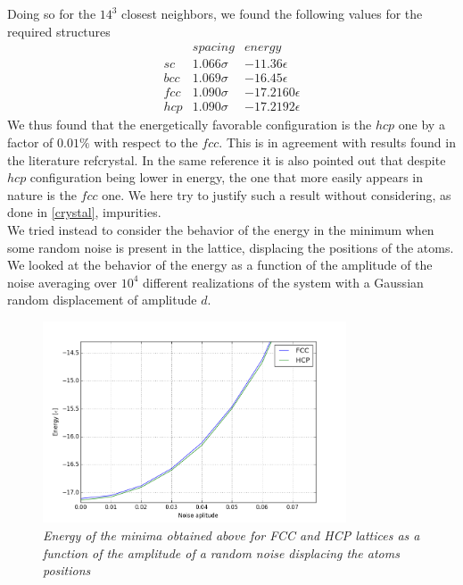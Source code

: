 \documentclass[a4paper]{article}
\begin{document}
Doing so for the $14^3$ closest neighbors, we found the following values for the required structures
\begin{eqnarray*}
&spacing&energy\\
sc&1.066\sigma&-11.36\epsilon\\
bcc&1.069\sigma&-16.45\epsilon\\
fcc&1.090\sigma&-17.2160\epsilon\\
hcp&1.090\sigma&-17.2192\epsilon
\end{eqnarray*}
We thus found that the energetically favorable configuration is the $hcp$ one by a factor of $0.01\%$ with respect to the $fcc$.
This is in agreement with results found in the literature ref{crystal}. 
In the same reference it is also pointed out that despite $hcp$ configuration being lower in energy, the one that more easily appears in nature is the $fcc$ one.
We here try to justify such a result without considering, as done in \ref{crystal}, impurities.\\
We tried instead to consider the behavior of the energy in the minimum when some random noise is present in the lattice, displacing the positions of the atoms.
We looked at the behavior of the energy as a function of the amplitude of the noise averaging over $10^4$ different realizations of the system with a Gaussian random displacement of amplitude $d$.

\begin{figure}[ht]
    \centering
    \includegraphics[width=9cm]{energy_noise.png}
    \caption{\it \label{noise}Energy of the minima obtained above for FCC and HCP lattices as a function of the amplitude of a random noise displacing the atoms positions}
\end{figure}
\end{document}
